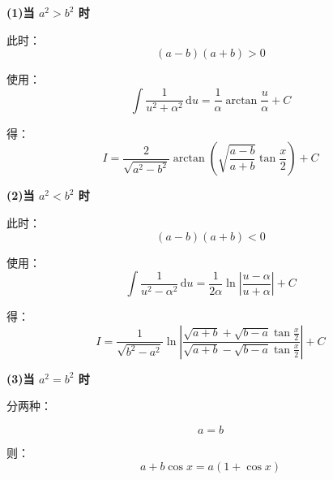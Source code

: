 \documentclass[../book.tex]{subfiles}
\begin{document}
\begin{enumerate}
\begin{enumerate}
\begin{analysisbox}
                \textbf{(1)\quad 当 $a^2>b^2$ 时}

                此时：
                \[
                    (a-b)(a+b)>0
                \]

                使用：
                \[
                    \int\frac{1}{u^2+\alpha^2}\,\mathrm{d}u
                    =
                    \frac1\alpha\arctan\frac{u}{\alpha}+C
                \]

                得：
                \[
                    I
                    =
                    \frac{2}{\sqrt{a^2-b^2}}
                    \arctan
                    \left(
                        \sqrt{
                            \frac{a-b}{a+b}
                        }
                        \tan\frac{x}{2}
                    \right)
                    +C
                \]

                \vspace{1em}

                \textbf{(2)\quad 当 $a^2<b^2$ 时}

                此时：
                \[
                    (a-b)(a+b)<0
                \]

                使用：
                \[
                    \int\frac{1}{u^2-\alpha^2}\,\mathrm{d}u
                    =
                    \frac1{2\alpha}
                    \ln\left|
                           \frac{u-\alpha}{u+\alpha}
                    \right|
                    +C
                \]

                得：
                \[
                    I
                    =
                    \frac{1}{\sqrt{b^2-a^2}}
                    \ln\left|
                           \frac{
                               \sqrt{a+b}
                               +
                               \sqrt{b-a}\tan\frac{x}{2}
                           }{
                               \sqrt{a+b}
                               -
                               \sqrt{b-a}\tan\frac{x}{2}
                           }
                    \right|
                    +C
                \]

                \vspace{1em}

                \textbf{(3)\quad 当 $a^2=b^2$ 时}

                分两种：

                \[
                    a=b
                \]

                则：
                \[
                    a+b\cos x
                    =
                    a(1+\cos x)
                \]


\end{analysisbox}
\end{enumerate}
\end{enumerate}
\end{document}
